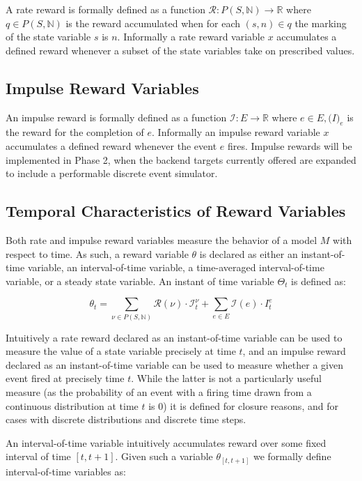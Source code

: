 \documentclass[11pt]{article}
\begin{document}
A rate reward is formally defined as a function $\mathcal{R}: P(S, \mathbb{N}) \rightarrow \mathbb{R}$ where $q \in P(S, \mathbb{N})$ is the reward accumulated when for each $(s,n) \in q$ the marking of the state variable $s$ is $n$.  Informally a rate reward variable $x$ accumulates a defined reward whenever a subset of the state variables take on prescribed values.

\subsection{Impulse Reward Variables}

An impulse reward is formally defined as a function $\mathcal{I}: E \rightarrow \mathbb{R}$ where $e \in E, \mathcal(I)_e$ is the reward for the completion of $e$.  Informally an impulse reward variable $x$ accumulates a defined reward whenever the event $e$ fires. Impulse rewards will be implemented in Phase 2, when the backend targets currently offered are expanded to include a performable discrete event simulator.

\subsection{Temporal Characteristics of Reward Variables}

Both rate and impulse reward variables measure the behavior of a model $M$ with respect to time.  As such, a reward variable $\theta$ is declared as either an instant-of-time variable, an interval-of-time variable, a time-averaged interval-of-time variable, or a steady state variable.  An instant of time variable $\Theta_t$ is defined as:

\[ \theta_t = \sum_{\nu \in P(S, \mathbb{N})} \mathcal{R}(\nu) \cdot \mathcal{I}^{\nu}_t + \sum_{e \in E} \mathcal{I}(e) \cdot I_t^e\]

Intuitively a rate reward declared as an instant-of-time variable \cite{freire1990technique} can be used to measure the value of a state variable precisely at time $t$, and an impulse reward declared as an instant-of-time variable can be used to measure whether a given event fired at precisely time $t$.  While the latter is not a particularly useful measure (as the probability of an event with a firing time drawn from a continuous distribution at time $t$ is $0$) it is defined for closure reasons, and for cases with discrete distributions and discrete time steps.

An interval-of-time variable intuitively accumulates reward over some fixed interval of time $[t, t+1]$.  Given such a variable $\theta_{[t, t+1]}$ we formally define interval-of-time variables as:
\end{document}
